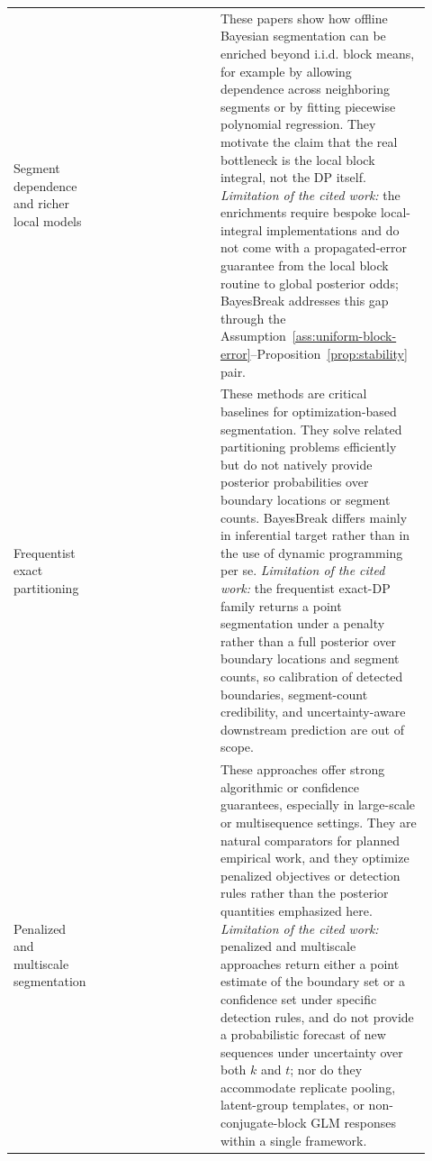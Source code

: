\begin{longtable}{p{0.17\linewidth}p{0.27\linewidth}p{0.48\linewidth}}
Segment dependence and richer local models &
\citet{fearnhead2011dependence, ruggieri2014bcpvs} &
These papers show how offline Bayesian segmentation can be enriched beyond i.i.d. block means, for
example by allowing dependence across neighboring segments or by fitting piecewise polynomial
regression. They motivate the claim that the real bottleneck is the local block integral, not the
DP itself. \emph{Limitation of the cited work:} the enrichments require bespoke local-integral
implementations and do not come with a propagated-error guarantee from the local block routine to
global posterior odds; BayesBreak addresses this gap through the
Assumption~\ref{ass:uniform-block-error}--Proposition~\ref{prop:stability} pair. \\

Frequentist exact partitioning &
\citet{auger1989segment, jackson2005optpart, killick2012pelt} &
These methods are critical baselines for optimization-based segmentation. They solve related
partitioning problems efficiently but do not natively provide posterior probabilities over boundary
locations or segment counts. BayesBreak differs mainly in inferential target rather than in the use
of dynamic programming per se. \emph{Limitation of the cited work:} the frequentist exact-DP family
returns a point segmentation under a penalty rather than a full posterior over boundary locations
and segment counts, so calibration of detected boundaries, segment-count credibility, and
uncertainty-aware downstream prediction are out of scope. \\

Penalized and multiscale segmentation &
\citet{tibshirani2005fused, bleakley2011groupfused, frick2014smuce, fryzlewicz2014wbs} &
These approaches offer strong algorithmic or confidence guarantees, especially in large-scale or
multisequence settings. They are natural comparators for planned empirical work, and they optimize
penalized objectives or detection rules rather than the posterior quantities emphasized here.
\emph{Limitation of the cited work:} penalized and multiscale approaches return either a point
estimate of the boundary set or a confidence set under specific detection rules, and do not
provide a probabilistic forecast of new sequences under uncertainty over both $k$ and $t$; nor do
they accommodate replicate pooling, latent-group templates, or non-conjugate-block GLM responses
within a single framework. \\


\end{longtable}

